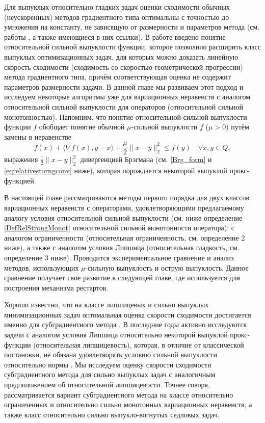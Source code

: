     Для выпуклых относительно гладких задач оценки сходимости обычных (неускоренных) методов градиентного типа оптимальны с точностью до умножения на константу, не зависящую от размерности и параметров метода (см. работы \cite{Bauschke,Drag,Dragomir,Lu_Nesterov_2018}, а также имеющиеся в них ссылки). В работе \cite{Lu_Nesterov_2018} введено понятие относительной сильной выпуклости функции, которое позволило расширить класс выпуклых оптимизационных задач, для которых можно доказать линейную скорость сходимости (сходимость со скоростью геометрической прогрессии) метода градиентного типа, причём соответствующая оценка не содержит параметров размерности задачи. В данной главе мы развиваем этот подход и исследуем некоторые алгоритмы уже для вариационных неравенств с аналогом относительной сильной выпуклости для операторов (относительной сильной монотонностью). Напомним, что понятие относительной сильной выпуклости \cite{Lu_Nesterov_2018} функции $f$ обобщает понятие обычной $\mu$-сильной выпуклости $f$ ($\mu > 0$) путём замены в неравенстве 
    \begin{equation}
    	f(x) + \langle \nabla{f(x)}, y - x \rangle  + \frac{\mu}{2} \|x - y \|_2^2 \leq f(y) \quad   \forall x, y \in Q,
    	\end{equation}
    выражения $\frac{1}{2} \|x - y \|_2^2 $ дивергенцией Брэгмана (см. \eqref{Brg_form} и \eqref{eqrelativestorngconv} ниже), которая порождается некоторой выпуклой прокс-функцией. 

    В настоящей главе рассматриваются методы первого порядка для двух классов вариационных неравенств с операторами, удовлетворяющими предлагаемому аналогу условия относительной сильной выпуклости (см. ниже определение  \ref{DefRelStrongMonot} относительной сильной монотонности оператора): с аналогом ограниченности (относительная ограниченность, см. определение 2 ниже), а также с аналогом условия Липшица (относительная гладкость, см. определение 3 ниже). Проводится экспериментальное сравнение и анализ методов, использующих $\mu$-сильную выпуклость и острую выпуклость. Данное сравнение получает свое развитие в следующей главе, где используется для построения механизма рестартов. 

    Хорошо известно, что на классе липшицевых и сильно выпуклых минимизационных задач оптимальная оценка скорости сходимости достигается именно для субградиентного метода \cite{Bach_2012}. В последние годы активно исследуются задачи с аналогом условия Липшица относительно некоторой выпуклой прокс-функции (относительная липшицевость), которая, в отличие от классической постановки, не обязана удовлетворять условию сильной выпуклости относительно нормы \cite{AdaMirr_2021,Lu_2018,Zhou_NIPS_2020}. Мы исследуем оценку скорости сходимости субградиентного метода для сильно выпуклых задач с аналогичным предположением об относительной липшицевости. Точнее говоря, рассматривается вариант субградиентного метода на классе относительно ограниченных и относительно сильно монотонных вариационных неравенств, а также класс относительно сильно выпукло-вогнутых седловых задач. 

